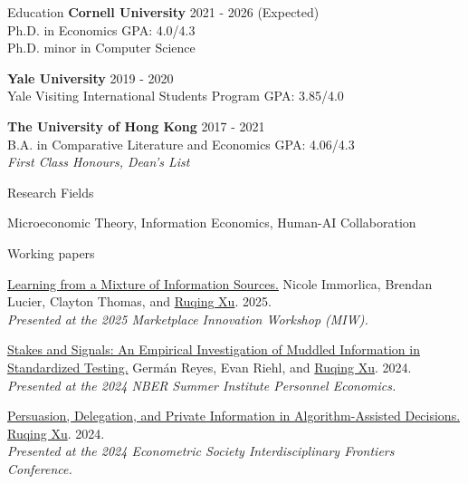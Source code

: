 \documentclass{resume} %
\begin{document}

\begin{rSection}{Education}
{\bf Cornell University} \hfill {2021 - 2026 (Expected)} 
\\ Ph.D. in Economics \hfill {GPA: 4.0/4.3} \\
Ph.D. minor in Computer Science \hfill 

{\bf Yale University} \hfill {2019 - 2020} 
\\ Yale Visiting International Students Program \hfill {GPA: 3.85/4.0}

{\bf The University of Hong Kong} \hfill {2017 - 2021} 
\\ B.A. in Comparative Literature and Economics \hfill {GPA: 4.06/4.3}
\\ \emph{First Class Honours, Dean's List}

\end{rSection}

\begin{rSection}{Research Fields} \itemsep -10pt
\item Microeconomic Theory, Information Economics, Human-AI Collaboration
\end{rSection}

\begin{rSection}{Working papers}

\href{https://ruqing-xu.github.io/assets/pdf/LearningfromMixture.pdf}{Learning from a Mixture of Information Sources.} Nicole Immorlica, Brendan Lucier, Clayton Thomas, and \underline{Ruqing Xu}. 2025.\\
\emph{Presented at the 2025 Marketplace Innovation Workshop (MIW).}

\href{https://ruqing-xu.github.io/assets/pdf/rrx_stakes_june2024.pdf}{Stakes and Signals: An Empirical Investigation of Muddled
Information in Standardized Testing.} Germán Reyes, Evan Riehl, and \underline{Ruqing Xu}. 2024. \\
\emph{Presented at the 2024 NBER Summer Institute Personnel Economics.}

\href{https://ruqing-xu.github.io/assets/pdf/delegation_xu.pdf}{Persuasion, Delegation, and Private Information in Algorithm-Assisted Decisions.} \underline{Ruqing Xu}. 2024. \\
 \emph{Presented at the 2024 Econometric Society Interdisciplinary Frontiers Conference.}


\end{rSection}
\end{document}

